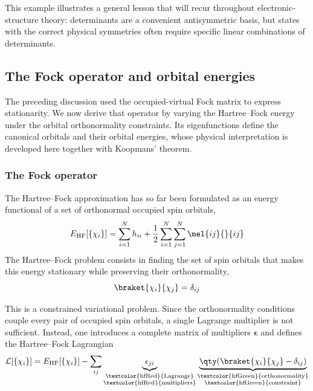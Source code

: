 \documentclass[11pt,a4paper,titlepage]{article}
\numberwithin{equation}{section}
\newcommand{\beps}{\boldsymbol{\epsilon}}
\newcommand{\red}[1]{\textcolor{hfRed}{#1}}
\newcommand{\green}[1]{\textcolor{hfGreen}{#1}}
\begin{document}
This example illustrates a general lesson that will recur throughout
electronic-structure theory: determinants are a convenient antisymmetric
basis, but states with the correct physical symmetries often require
specific linear combinations of determinants.

\subsection{The Fock operator and orbital energies}

The preceding discussion used the occupied-virtual Fock matrix to express
stationarity. We now derive that operator by varying the Hartree--Fock energy
under the orbital orthonormality constraints. Its eigenfunctions
define the canonical orbitals and their orbital energies, whose physical
interpretation is developed here together with Koopmans' theorem.

\subsubsection{The Fock operator}
\label{sec:fock-operator}

The Hartree--Fock approximation has so far been formulated as an energy
functional of a set of orthonormal occupied spin orbitals,
\begin{equation}
  E_\text{HF}[\{\chi_i\}]
  =
  \sum_{i=1}^{N} h_{ii}
  +
  \frac{1}{2}
  \sum_{i=1}^{N}\sum_{j=1}^{N}
  \mel{ij}{}{ij}
  \label{eq:hf-energy-orbital-functional}
\end{equation}
The Hartree--Fock problem consists in finding the set of spin orbitals that
makes this energy stationary while preserving their orthonormality,
\begin{equation}
  \braket{\chi_i}{\chi_j}
  =
  \delta_{ij}
\end{equation}

This is a constrained variational problem. Since the orthonormality
conditions couple every pair of occupied spin orbitals, a single Lagrange
multiplier is not sufficient. Instead, one introduces a complete matrix of
multipliers $\beps$ and defines the Hartree--Fock Lagrangian
\begin{equation}
  \mathcal{L}[\{\chi_i\}]
  =
  E_\text{HF}[\{\chi_i\}]
  -
  \sum_{ij}
  \underbrace{\epsilon_{ji}}_{
    \substack{\text{\red{Lagrange}}\\
              \text{\red{multipliers}}}
  }
  \underbrace{
    \qty(
      \braket{\chi_i}{\chi_j}
      -
      \delta_{ij}
    )
  }_{
    \substack{\text{\green{orthonormality}}\\
              \text{\green{constraint}}}
  }
  \label{eq:hf-lagrangian}
\end{equation}
\end{document}
